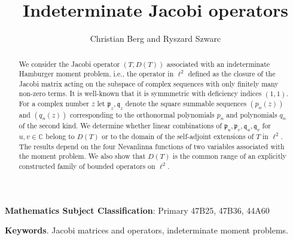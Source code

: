 \documentclass [12pt]{article}
\title{Indeterminate Jacobi operators}
\author{Christian Berg and Ryszard Szwarc}
\newcommand{\C}{\mathbb{C}}
\begin{document}
 \maketitle

\begin{abstract} We consider the Jacobi operator $(T,D(T))$ associated with an indeterminate Hamburger moment problem, i.e., the operator in $\ell^2$ defined as the closure of the Jacobi matrix acting on the subspace of complex sequences with only finitely many non-zero terms. It is well-known that it is symmmetric with deficiency indices $(1,1)$. For a complex number $z$ let $\mathfrak{p}_z, \mathfrak{q}_z$ denote the square summable sequences $(p_n(z))$ and $(q_n(z))$    
 corresponding to the orthonormal polynomials $p_n$ and  polynomials $q_n$ of the second kind. We determine whether linear combinations of $\mathfrak{p}_u, \mathfrak{p}_v,\mathfrak{q}_u,\mathfrak{q}_v$ for $u,v\in\C$ belong to $D(T)$ or to the domain of the self-adjoint extensions of $T$ in $\ell^2$.
The results depend on the four Nevanlinna functions of two variables associated with the moment problem. We also show that $D(T)$ is the common range of an explicitly constructed family of bounded operators on $\ell^2$.  
\end{abstract}

{\bf Mathematics Subject Classification}: Primary 47B25, 47B36, 44A60

{\bf Keywords}. Jacobi matrices and operators, indeterminate moment problems.
\end{document}
